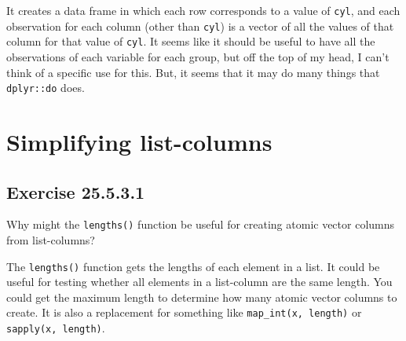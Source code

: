 \documentclass[]{book}
\newenvironment{Shaded}{\begin{snugshade}}{\end{snugshade}}
\newcommand{\CommentTok}[1]{\textcolor[rgb]{0.56,0.35,0.01}{\textit{#1}}}
\newcommand{\KeywordTok}[1]{\textcolor[rgb]{0.13,0.29,0.53}{\textbf{#1}}}
\newcommand{\NormalTok}[1]{#1}
\newcommand{\OperatorTok}[1]{\textcolor[rgb]{0.81,0.36,0.00}{\textbf{#1}}}
\newcommand{\StringTok}[1]{\textcolor[rgb]{0.31,0.60,0.02}{#1}}
\theoremstyle{plain}
\theoremstyle{remark}
\begin{document}
\begin{Shaded}
\end{Shaded}

It creates a data frame in which each row corresponds to a value of \texttt{cyl},
and each observation for each column (other than \texttt{cyl}) is a vector of all the values of that column for that value of \texttt{cyl}.
It seems like it should be useful to have all the observations of each variable for each group, but off the top of my head, I can't think of a specific use for this.
But, it seems that it may do many things that \texttt{dplyr::do} does.

\hypertarget{simplifying-list-columns}{%
\section{Simplifying list-columns}\label{simplifying-list-columns}}

\hypertarget{exercise-25.5.3.1}{%
\subsection*{\texorpdfstring{Exercise {25.5.3.1}}{Exercise 25.5.3.1}}\label{exercise-25.5.3.1}}

Why might the \texttt{lengths()} function be useful for creating atomic vector columns from list-columns?

The \texttt{lengths()} function gets the lengths of each element in a list.
It could be useful for testing whether all elements in a list-column are the same length.
You could get the maximum length to determine how many atomic vector columns to create.
It is also a replacement for something like \texttt{map\_int(x,\ length)} or \texttt{sapply(x,\ length)}.
\end{document}
